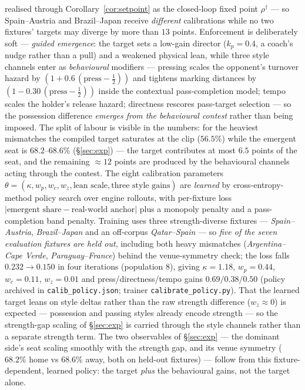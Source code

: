 \documentclass[11pt]{article}
\theoremstyle{definition}
\theoremstyle{remark}
\begin{document}
realised through Corollary~\ref{cor:setpoint} as the closed-loop fixed point $\rho^\dagger$ --- so Spain--Austria and Brazil--Japan receive \emph{different} calibrations while no two fixtures' targets may diverge by more than $13$ points. Enforcement is deliberately soft --- \emph{guided emergence}: the target sets a low-gain director ($k_p=0.4$, a coach's nudge rather than a pull) and a weakened physical lean, while three style channels enter as \emph{behavioural} modifiers --- pressing scales the opponent's turnover hazard by $(1+0.6\,(\mathrm{press}-\tfrac12))$ and tightens marking distances by $(1-0.30\,(\mathrm{press}-\tfrac12))$ inside the contextual pass-completion model; tempo scales the holder's release hazard; directness rescores pass-target selection --- so the possession difference \emph{emerges from the behavioural contest} rather than being imposed. The split of labour is visible in the numbers: for the heaviest mismatches the compiled target saturates at the clip ($56.5\%$) while the emergent seat is $68.2$--$68.6\%$ (\S\ref{sec:exp}) --- the target contributes at most $6.5$ points of the seat, and the remaining $\approx12$ points are produced by the behavioural channels acting through the contest. The eight calibration parameters $\theta=(\kappa,w_p,w_c,w_z,\text{lean scale},\text{three style gains})$ are \emph{learned} by cross-entropy-method policy search \citep{rubinstein2004} over engine rollouts, with per-fixture loss $|\text{emergent share}-\text{real-world anchor}|$ plus a monopoly penalty and a pass-completion band penalty. Training uses three strength-diverse fixtures --- \emph{Spain--Austria}, \emph{Brazil--Japan} and an off-corpus \emph{Qatar--Spain} --- so \emph{five of the seven evaluation fixtures are held out}, including both heavy mismatches (\emph{Argentina--Cape Verde}, \emph{Paraguay--France}) behind the venue-symmetry check; the loss falls $0.232\to0.150$ in four iterations (population $8$), giving $\kappa=1.18$, $w_p=0.44$, $w_c=0.11$, $w_z=0.01$ and press/directness/tempo gains $0.69/0.38/0.50$ (policy archived in \texttt{calib\_policy.json}; trainer \texttt{calibrate\_policy.py}). That the learned target leans on style deltas rather than the raw strength difference ($w_z\approx0$) is expected --- possession and passing styles already encode strength --- so the strength-gap scaling of \S\ref{sec:exp} is carried through the style channels rather than a separate strength term. The two observables of \S\ref{sec:exp} --- the dominant side's seat scaling smoothly with the strength gap, and its venue symmetry ($68.2\%$ home vs $68.6\%$ away, both on held-out fixtures) --- follow from this fixture-dependent, learned policy: the target \emph{plus} the behavioural gains, not the target alone.
\end{document}
